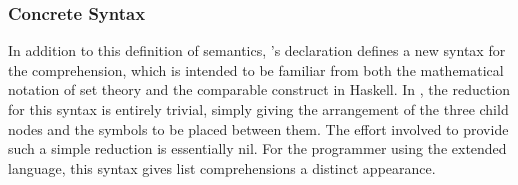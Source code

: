 

\subsubsection{Concrete Syntax}
In addition to this definition of semantics, \Meta's declaration defines a new syntax for the comprehension, which is intended to be familiar from both the mathematical notation of set theory and the comparable construct in Haskell. In \Meta, the reduction for this syntax is entirely trivial, simply giving the arrangement of the three child nodes and the symbols to be placed between them. The effort involved to provide such a simple reduction is essentially nil. For the programmer using the extended language, this syntax gives list comprehensions a distinct appearance. 


